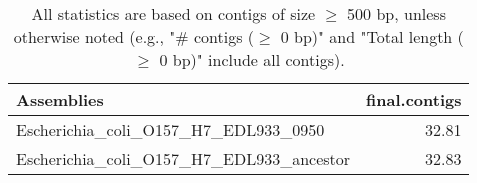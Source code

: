 \documentclass[12pt,a4paper]{article}
\begin{document}
\begin{table}[ht]
\begin{center}
\caption{All statistics are based on contigs of size $\geq$ 500 bp, unless otherwise noted (e.g., "\# contigs ($\geq$ 0 bp)" and "Total length ($\geq$ 0 bp)" include all contigs).}
\begin{tabular}{|l*{1}{|r}|}
\hline
Assemblies & final.contigs \\ \hline
Escherichia\_coli\_O157\_H7\_EDL933\_0950 & 32.81 \\ \hline
Escherichia\_coli\_O157\_H7\_EDL933\_ancestor & 32.83 \\ \hline
\end{tabular}
\end{center}
\end{table}
\end{document}
